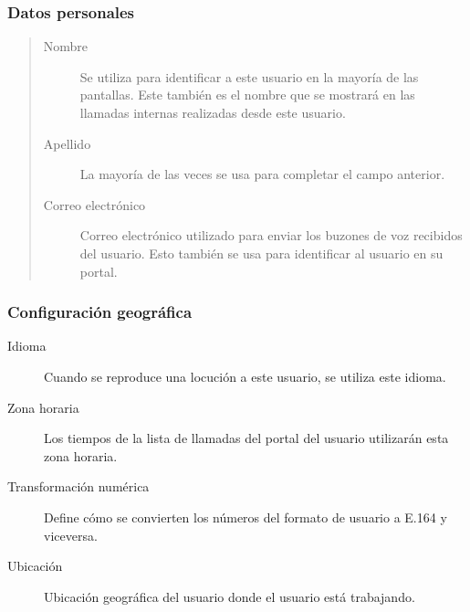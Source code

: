 \documentclass[letterpaper,10pt,spanish]{sphinxmanual}
\begin{document}
\subsubsection{Datos personales}
\label{administration_portal/client/vpbx/users:personal-data}\begin{quote}
\begin{description}
\item[{Nombre}] \leavevmode
Se utiliza para identificar a este usuario en la mayoría de las pantallas. Este también es el nombre que se mostrará en las llamadas internas realizadas desde este usuario.

\item[{Apellido}] \leavevmode
La mayoría de las veces se usa para completar el campo anterior.

\item[{Correo electrónico}] \leavevmode
Correo electrónico utilizado para enviar los buzones de voz recibidos del usuario. Esto también se usa para identificar al usuario en su portal.

\end{description}
\end{quote}


\subsubsection{Configuración geográfica}
\label{administration_portal/client/vpbx/users:geographic-configuration}\begin{description}
\item[{Idioma}] \leavevmode{}\label{administration_portal/client/vpbx/users:term-language}
Cuando se reproduce una locución a este usuario, se utiliza este idioma.

\item[{Zona horaria}] \leavevmode{}\label{administration_portal/client/vpbx/users:term-timezone}
Los tiempos de la lista de llamadas del portal del usuario utilizarán esta zona horaria.

\item[{Transformación numérica}] \leavevmode{}\label{administration_portal/client/vpbx/users:term-numeric-transformation}
Define cómo se convierten los números del formato de usuario a E.164 y viceversa.

\item[{Ubicación}] \leavevmode{}\label{administration_portal/client/vpbx/users:term-location}
Ubicación geográfica del usuario donde el usuario está trabajando.

\end{description}
\end{document}
